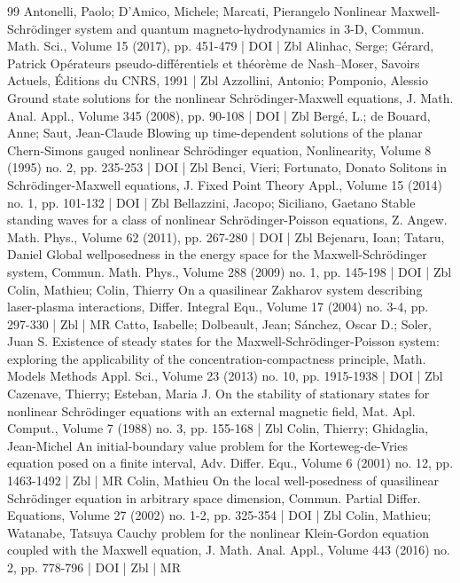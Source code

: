 \begin{thebibliography}{99}
Antonelli, Paolo; D’Amico, Michele; Marcati, Pierangelo Nonlinear Maxwell-Schrödinger system and quantum magneto-hydrodynamics in 3-D, Commun. Math. Sci., Volume 15 (2017), pp. 451-479 | DOI | Zbl
Alinhac, Serge; Gérard, Patrick Opérateurs pseudo-différentiels et théorème de Nash–Moser, Savoirs Actuels, Éditions du CNRS, 1991 | Zbl
Azzollini, Antonio; Pomponio, Alessio Ground state solutions for the nonlinear Schrödinger-Maxwell equations, J. Math. Anal. Appl., Volume 345 (2008), pp. 90-108 | DOI | Zbl
Bergé, L.; de Bouard, Anne; Saut, Jean-Claude Blowing up time-dependent solutions of the planar Chern-Simons gauged nonlinear Schrödinger equation, Nonlinearity, Volume 8 (1995) no. 2, pp. 235-253 | DOI | Zbl
Benci, Vieri; Fortunato, Donato Solitons in Schrödinger-Maxwell equations, J. Fixed Point Theory Appl., Volume 15 (2014) no. 1, pp. 101-132 | DOI | Zbl
Bellazzini, Jacopo; Siciliano, Gaetano Stable standing waves for a class of nonlinear Schrödinger-Poisson equations, Z. Angew. Math. Phys., Volume 62 (2011), pp. 267-280 | DOI | Zbl
Bejenaru, Ioan; Tataru, Daniel Global wellposedness in the energy space for the Maxwell-Schrödinger system, Commun. Math. Phys., Volume 288 (2009) no. 1, pp. 145-198 | DOI | Zbl
Colin, Mathieu; Colin, Thierry On a quasilinear Zakharov system describing laser-plasma interactions, Differ. Integral Equ., Volume 17 (2004) no. 3-4, pp. 297-330 | Zbl | MR
Catto, Isabelle; Dolbeault, Jean; Sánchez, Oscar D.; Soler, Juan S. Existence of steady states for the Maxwell-Schrödinger-Poisson system: exploring the applicability of the concentration-compactness principle, Math. Models Methods Appl. Sci., Volume 23 (2013) no. 10, pp. 1915-1938 | DOI | Zbl
Cazenave, Thierry; Esteban, Maria J. On the stability of stationary states for nonlinear Schrödinger equations with an external magnetic field, Mat. Apl. Comput., Volume 7 (1988) no. 3, pp. 155-168 | Zbl
Colin, Thierry; Ghidaglia, Jean-Michel An initial-boundary value problem for the Korteweg-de-Vries equation posed on a finite interval, Adv. Differ. Equ., Volume 6 (2001) no. 12, pp. 1463-1492 | Zbl | MR
Colin, Mathieu On the local well-posedness of quasilinear Schrödinger equation in arbitrary space dimension, Commun. Partial Differ. Equations, Volume 27 (2002) no. 1-2, pp. 325-354 | DOI | Zbl
Colin, Mathieu; Watanabe, Tatsuya Cauchy problem for the nonlinear Klein-Gordon equation coupled with the Maxwell equation, J. Math. Anal. Appl., Volume 443 (2016) no. 2, pp. 778-796 | DOI | Zbl | MR

\end{thebibliography}
